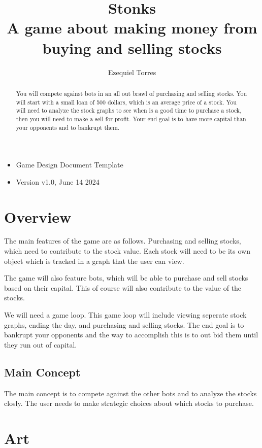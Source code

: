 \documentclass{report}
\title{Stonks \large \\
A game about making money from buying and selling stocks}
\author{Ezequiel Torres}
\begin{document}
\maketitle 
\begin{itemize}
    \item Game Design Document Template
    \item Version v1.0, June 14 2024\\
\end{itemize}
\newpage

\begin{abstract}
You will compete against bots in an all out brawl of purchasing and selling stocks. You will start with a small loan of 500 dollars, which is an average price of a stock. You will need to analyze the stock graphs to see when is a good time to purchase a stock, then you will need to make a sell for profit. Your end goal is to have more capital than your opponents and to bankrupt them.
\end{abstract}
\chapter{Overview}

The main features of the game are as follows. Purchasing and selling stocks, which need to contribute to the stock value. Each stock will need to be its own object which is tracked in a graph that the user can view. 

The game will also feature bots, which will be able to purchase and sell stocks based on their capital. This of course will also contribute to the value of the stocks. 

We will need a game loop. This game loop will include viewing seperate stock graphs, ending the day, and purchasing and selling stocks. The end goal is to bankrupt your opponents and the way to accomplish this is to out bid them until they run out of capital. 

\section{Main Concept}
The main concept is to compete against the other bots and to analyze the stocks closly. The user needs to make strategic choices about which stocks to purchase.

\chapter{Art}
\end{document}
